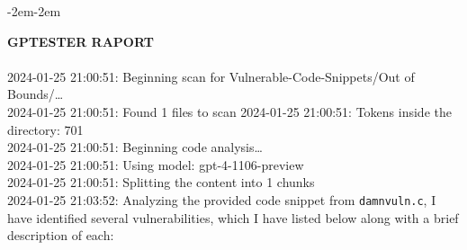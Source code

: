 \begin{adjustwidth}
{-2em}{-2em}
\begin{tcolorbox}[breakable, colback=gray!10!white,colframe=gray!50!black,title=Wynik działania programu w formacie Markdown, left=2mm, right=2mm, top=1mm, bottom=1mm]
  \LARGE{\textbf{GPTESTER RAPORT}} \normalsize \\\\
2024-01-25 21:00:51: Beginning scan for Vulnerable-Code-Snippets/Out of Bounds/\ldots{} \\
2024-01-25 21:00:51: Found 1 files to scan 2024-01-25 21:00:51: Tokens inside the directory: 701 \\
2024-01-25 21:00:51: Beginning code analysis\ldots{} \\
2024-01-25 21:00:51: Using model: gpt-4-1106-preview \\
2024-01-25 21:00:51: Splitting the content into 1 chunks \\
2024-01-25 21:03:52: Analyzing the provided  code snippet from \texttt{damnvuln.c}, I have identified several vulnerabilities, which I have listed below along with a brief description of each: 


\end{tcolorbox}
\end{adjustwidth}
